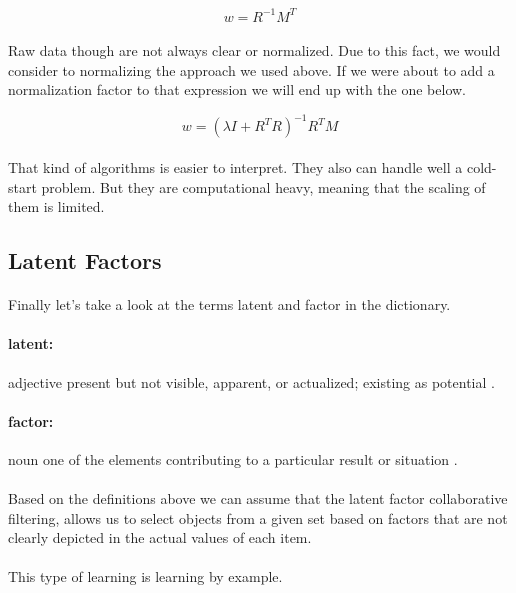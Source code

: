 \begin{equation}
w=R^{-1}M^{T}
\end{equation}

\paragraph{}Raw data though are not always clear or normalized. Due to this fact, we would consider to normalizing the approach we used above. If we were about to add a normalization factor to that expression we will end up with the one below.

\begin{equation}
w=(\lambda I + R^{T}R)^{-1} R^{T}M 
\end{equation}

\paragraph{}That kind of algorithms is easier to interpret. They also can handle well a cold-start problem. But they are computational heavy, meaning that the scaling of them is limited.

\subsection{Latent Factors}
\paragraph{} Finally let's take a look at the terms latent and factor in the dictionary.
\paragraph{latent:} adjective present but not visible, apparent, or actualized; existing as potential \cite{Dictionary.com2017}.
\paragraph{factor:} noun one of the elements contributing to a particular result or situation \cite{Dictionary.com2017}.
\paragraph{} Based on the definitions above we can assume that the latent factor collaborative filtering, allows us to select objects from a given set based on factors that are not clearly depicted in the actual values of each item.
\paragraph{} This type of learning is learning by example.
